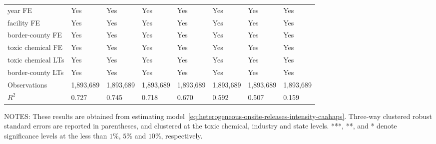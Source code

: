 \begin{table}[H]
{\begin{tabular}{@{}llllllll@{}}
            year FE                         & Yes       & Yes           & Yes       & Yes          & Yes             & Yes           & Yes                 \\
            facility FE                     & Yes       & Yes           & Yes       & Yes          & Yes             & Yes           & Yes                 \\
            border-county FE                & Yes       & Yes           & Yes       & Yes          & Yes             & Yes           & Yes                 \\
            toxic chemical FE               & Yes       & Yes           & Yes       & Yes          & Yes             & Yes           & Yes                 \\
            toxic chemical LTs              & Yes       & Yes           & Yes       & Yes          & Yes             & Yes           & Yes                 \\
            border-county LTs               & Yes       & Yes           & Yes       & Yes          & Yes             & Yes           & Yes                 \\ \midrule
            Observations                    & 1,893,689 & 1,893,689     & 1,893,689 & 1,893,689    & 1,893,689       & 1,893,689     & 1,893,689           \\
            $R^2$                           & 0.727     & 0.745         & 0.718     & 0.670        & 0.592           & 0.507         & 0.159               \\ \bottomrule \bottomrule
        \end{tabular}%
    }
    \begin{minipage}{\columnwidth}
        \vspace{0.05in}
        \tiny NOTES: These results are obtained from estimating model~\ref{eq:heterogeneous-onsite-releases-intensity-caahaps}. Three-way clustered robust standard errors are reported in parentheses, and clustered at the toxic chemical, industry and state levels. ***, **, and * denote significance levels at the less than $1\%$, $5\%$ and $10\%$, respectively.
    \end{minipage}
\end{table}